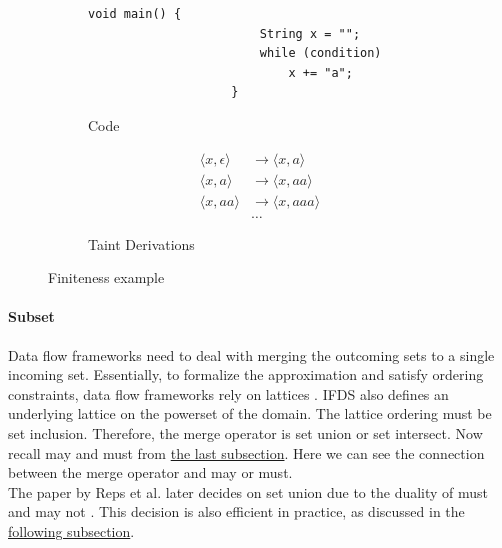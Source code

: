 \documentclass[../draft.tex]{subfiles}
\begin{document}
    \begin{figure}[ht]
        \centering
        \begin{subfigure}[b]{0.45\textwidth}
            \centering
            \begin{adjustbox}{max width=\columnwidth}
                \begin{lstlisting}[gobble=20]
                    void main() {
                        String x = "";
                        while (condition)
                            x += "a";
                    }
                \end{lstlisting}
            \end{adjustbox}
            \caption{Code}
        \end{subfigure}
        \qquad
        \begin{subfigure}[b]{0.45\textwidth}
            \centering
            $$
                \begin{aligned}
                    \langle x, \epsilon \rangle &\rightarrow \langle x, a \rangle\\
                    \langle x, a \rangle &\rightarrow \langle x, aa \rangle\\
                    \langle x, aa \rangle &\rightarrow \langle x, aaa \rangle\\
                    &\dots
                \end{aligned}
            $$
            \caption{Taint Derivations}
            \label{lst:ifdsfinite_b}
        \end{subfigure}
        \caption{Finiteness example}
        \label{lst:ifdsfinite}
    \end{figure}

    \paragraph{Subset} Data flow frameworks need to deal with merging the outcoming sets to a single incoming set. 
    Essentially, to formalize the approximation and satisfy ordering constraints, data flow frameworks rely on lattices \cite{Khedker2009}. 
    IFDS also defines an underlying lattice on the powerset of the domain. 
    The lattice ordering must be set inclusion. 
    Therefore, the merge operator is set union or set intersect. 
    Now recall may and must from \hyperref[s:dataflow]{the last subsection}. 
    Here we can see the connection between the merge operator and may or must.\\
    The paper by Reps et al. later decides on set union due to the duality of must and may not \cite{Reps1995}. 
    This decision is also efficient in practice, as discussed in the \hyperref[s:ifdspractical]{following subsection}.
\end{document}
